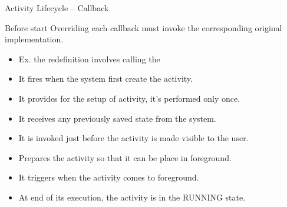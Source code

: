 \documentclass{beamer}
\begin{document}
\begin{frame}[allowframebreaks]{Activity Lifecycle -- Callback}
  \begin{block}{Before start}
    Overriding each callback must invoke the corresponding original implementation.
    \begin{itemize}
      \item Ex. the  redefinition involves calling the 
    \end{itemize}
  \end{block}

  \begin{block}{}
    \begin{itemize}
      \item It fires when the system first create the activity.
      \item It provides for the setup of activity, it's performed only once.
      \item It receives any previously saved state from the system.
    \end{itemize}
  \end{block}

  \newpage

  \begin{block}{}
    \begin{itemize}
      \item It is invoked just before the activity is made visible to the user.
      \item Prepares the activity so that it can be place in foreground.
    \end{itemize}
  \end{block}

  \begin{block}{}
    \begin{itemize}
      \item It triggers when the activity comes to foreground.
      \item At end of its execution, the activity is in the RUNNING state.
    \end{itemize}
  \end{block}


\end{frame}
\end{document}
